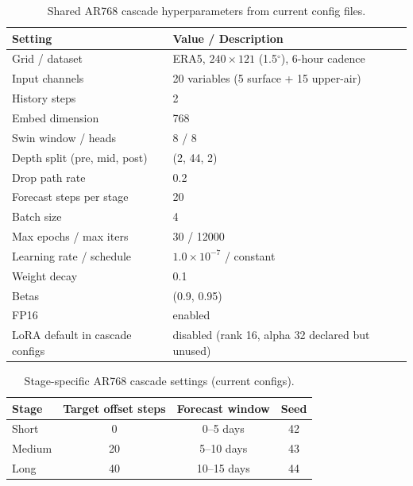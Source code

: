 \documentclass[12pt]{report}
\begin{document}
\begin{table}[H]
\centering
\caption{Shared AR768 cascade hyperparameters from current config files.}
\begin{tabular}{ll}
\hline
\textbf{Setting} & \textbf{Value / Description} \\
\hline
Grid / dataset & ERA5, $240\times121$ (1.5$^\circ$), 6-hour cadence \\
Input channels & 20 variables (5 surface + 15 upper-air) \\
History steps & 2 \\
Embed dimension & 768 \\
Swin window / heads & 8 / 8 \\
Depth split (pre, mid, post) & (2, 44, 2) \\
Drop path rate & 0.2 \\
Forecast steps per stage & 20 \\
Batch size & 4 \\
Max epochs / max iters & 30 / 12000 \\
Learning rate / schedule & $1.0\times10^{-7}$ / constant \\
Weight decay & 0.1 \\
Betas & (0.9, 0.95) \\
FP16 & enabled \\
LoRA default in cascade configs & disabled (rank 16, alpha 32 declared but unused) \\
\hline
\end{tabular}
\end{table}

\begin{table}[H]
\centering
\caption{Stage-specific AR768 cascade settings (current configs).}
\begin{tabular}{lccc}
\hline
\textbf{Stage} & \textbf{Target offset steps} & \textbf{Forecast window} & \textbf{Seed} \\
\hline
Short & 0 & 0--5 days & 42 \\
Medium & 20 & 5--10 days & 43 \\
Long & 40 & 10--15 days & 44 \\
\hline
\end{tabular}
\end{table}
\end{document}

